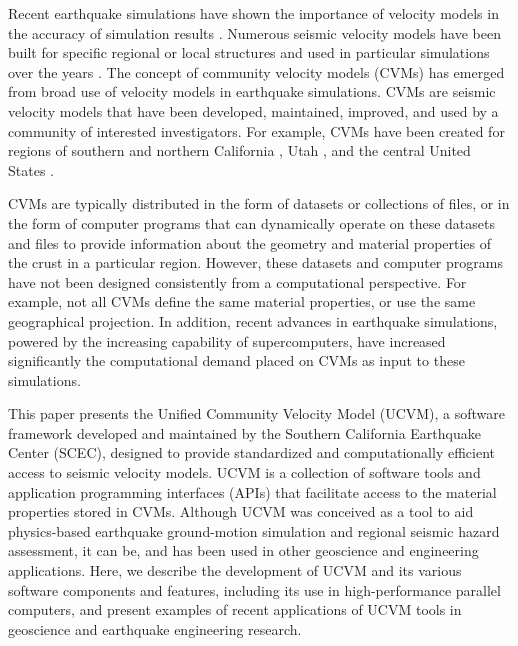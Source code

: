 Recent earthquake simulations have shown the importance of velocity models in the accuracy of simulation results \citep[e.g.,][]{Taborda_2014_BSSA}. Numerous seismic velocity models have been built for specific regional or local structures and used in particular simulations over the years \citep[e.g.,][]{Frankel_1992_BSSA, Brocher_2008_BSSA, Graves_2008_BSSA}. The concept of community velocity models (CVMs) has emerged from broad use of velocity models in earthquake simulations. CVMs are seismic velocity models that have been developed, maintained, improved, and used by a community of interested investigators. For example, CVMs have been created for regions of southern and northern California \citep[][]{Kohler_2003_BSSA, Suss_2003_JGR, Brocher_2006_Proc, Shaw_2015_EPSL}, Utah \citep[][]{Magistrale_2006_Tech}, and the central United States \citep[][]{RamirezGuzman_2012_BSSA}.

CVMs are typically distributed in the form of datasets or collections of files, or in the form of computer programs that can dynamically operate on these datasets and files to provide information about the geometry and material properties of the crust in a particular region. However, these datasets and computer programs have not been designed consistently from a computational perspective. For example, not all CVMs define the same material properties, or use the same geographical projection. In addition, recent advances in earthquake simulations, powered by the increasing capability of supercomputers, have increased significantly the computational demand placed on CVMs as input to these simulations.

This paper presents the Unified Community Velocity Model (UCVM), a software framework developed and maintained by the Southern California Earthquake Center (SCEC), designed to provide standardized and computationally efficient access to seismic velocity models. UCVM is a collection of software tools and application programming interfaces (APIs) that facilitate access to the material properties stored in CVMs. Although UCVM was conceived as a tool to aid physics-based earthquake ground-motion simulation and regional seismic hazard assessment, it can be, and has been used in other geoscience and engineering applications. Here, we describe the development of UCVM and its various software components and features, including its use in high-performance parallel computers, and present examples of recent applications of UCVM tools in geoscience and earthquake engineering research.

